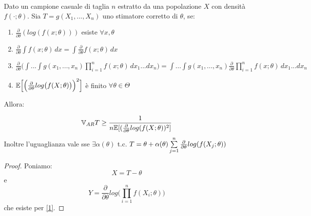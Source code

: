 \begin{theorem}
Dato un campione casuale di taglia $n$ estratto da una popolazione $X$ con densità $f(\cdot;\theta)$. Sia $T=g(X_1,...,X_n)$ uno stimatore corretto di $\theta$, se:
\begin{enumerate}
    \item $\frac{\partial}{\partial\theta}(log(f(x;\theta)))$ esiste $\forall x,\theta$ \label{1}
    \item $\frac{\partial}{\partial\theta}\int f(x;\theta) \,dx = \int \frac{\partial}{\partial\theta} f(x;\theta) \,dx$ \label{2}
    \item $\frac{\partial}{\partial\theta}\big(\int...\int g(x_1,...,x_n)\prod\limits_{i=1}^n f(x;\theta)\,dx_1...dx_n\big)=\int...\int g(x_1,...,x_n)\frac{\partial}{\partial\theta}\prod\limits_{i=1}^n f(x;\theta) \,dx_1...dx_n$ \label{3}
    \item $\mathbb{E} \Big[\Big(\frac{\partial}{\partial\theta}log\big(f(X;\theta)\big)\Big)^2\Big]$ è finito $\forall\theta\in\Theta$ \label{4}
\end{enumerate}

Allora:
    \item \[ \mathbb{V}_{AR} T \geq \frac{1}{n\mathbb{E}[(\frac{\partial}{\partial\theta}log(f(X;\theta))^2]}\]
Inoltre l'uguaglianza vale sse $\exists\alpha(\theta)$ t.c. $T=\theta+\alpha(\theta)\sum\limits_{j=1}^n\frac{\partial}{\partial\theta}log(f(X_j;\theta))$
\begin{proof}
Poniamo: \[X=T-\theta\] e \[Y=\frac{\partial}{\partial\theta}log\bigg(\prod_{i=1}^nf(X_i;\theta)\bigg)\] che esiste per \ref{1}.


\end{proof}
\end{theorem}
